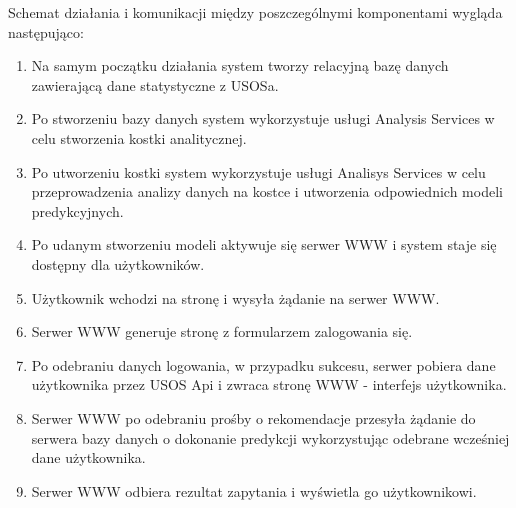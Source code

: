 \documentclass[licencjacka]{pracamgr}
\begin{document}
Schemat działania i komunikacji między poszczególnymi komponentami wygląda następująco:
\begin{enumerate}

\item Na samym początku działania system tworzy relacyjną bazę danych zawierającą dane statystyczne z USOSa. 

\item Po stworzeniu bazy danych system wykorzystuje usługi Analysis Services w celu stworzenia kostki analitycznej.

\item Po utworzeniu kostki system wykorzystuje usługi Analisys Services w celu przeprowadzenia analizy
danych na kostce i utworzenia odpowiednich modeli predykcyjnych.

\item Po udanym stworzeniu modeli aktywuje się serwer WWW i system staje się dostępny dla użytkowników. 

\item Użytkownik wchodzi na stronę i wysyła żądanie na serwer WWW.

\item Serwer WWW generuje stronę z formularzem zalogowania się.

\item Po odebraniu danych logowania, w przypadku sukcesu, serwer pobiera dane użytkownika przez USOS Api i zwraca stronę WWW - interfejs użytkownika.

\item Serwer WWW po odebraniu prośby o rekomendacje przesyła żądanie do serwera bazy danych o dokonanie predykcji wykorzystując odebrane wcześniej dane użytkownika.

\item Serwer WWW odbiera rezultat zapytania i wyświetla go użytkownikowi.

\end{enumerate}
\end{document}
